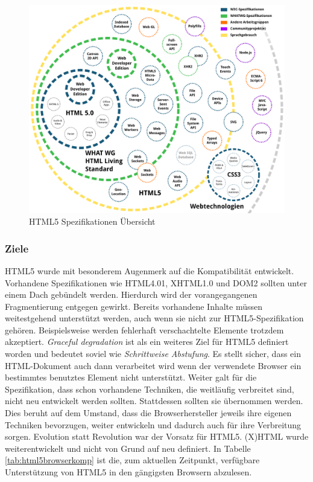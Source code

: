 \vspace{1em}
\begin{figure}[htb]
  \centering
  \includegraphics[width=0.75\linewidth]{abb/html5_specs}
  \caption[HTML5 Spezifikationen Übersicht]{HTML5 Spezifikationen Übersicht \cite{PeteKroe2014}}
  \label{fig:html5specs}
\end{figure}

\subsubsection{Ziele} HTML5 wurde mit besonderem Augenmerk auf die Kompatibilität entwickelt. Vorhandene Spezifikationen wie HTML4.01, XHTML1.0 und DOM2 sollten unter einem Dach gebündelt werden. Hierdurch wird der vorangegangenen Fragmentierung entgegen gewirkt. Bereits vorhandene Inhalte müssen weitestgehend unterstützt werden, auch wenn sie nicht zur HTML5-Spezifikation gehören. Beispielsweise werden fehlerhaft verschachtelte Elemente trotzdem akzeptiert. \textit{Graceful degradation} ist als ein weiteres Ziel für HTML5 definiert worden und bedeutet soviel wie \textit{Schrittweise Abstufung}. Es stellt sicher, dass ein HTML-Dokument auch dann verarbeitet wird wenn der verwendete Browser ein bestimmtes benutztes Element nicht unterstützt. Weiter galt für die Spezifikation, dass schon vorhandene Techniken, die weitläufig verbreitet sind, nicht neu entwickelt werden sollten. Stattdessen sollten sie übernommen werden. Dies beruht auf dem Umstand, dass die Browserhersteller jeweils ihre eigenen Techniken bevorzugen, weiter entwickeln und dadurch auch für ihre Verbreitung sorgen. Evolution statt Revolution war der Vorsatz für HTML5. (X)HTML wurde weiterentwickelt und nicht von Grund auf neu definiert. In Tabelle \ref{tab:html5browserkomp} ist die, zum aktuellen Zeitpunkt, verfügbare Unterstützung von HTML5 in den gängigsten Browsern abzulesen.

